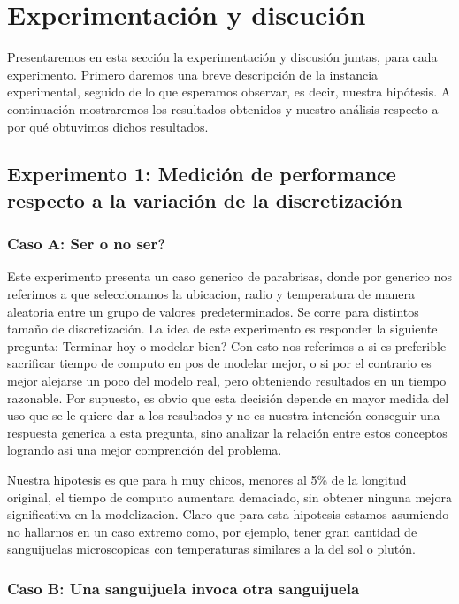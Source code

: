 \section{Experimentaci\'on y discuci\'on}

Presentaremos en esta sección la experimentación y discusión juntas, para cada experimento. Primero 
daremos una breve descripción de la instancia 
experimental, seguido de lo que esperamos observar, es decir, nuestra hipótesis. A continuación mostraremos los 
resultados obtenidos y nuestro análisis respecto a por qué obtuvimos dichos resultados. 

\subsection{Experimento 1: Medici\'on de performance respecto a la variaci\'on de la discretizaci\'on}

\subsubsection{Caso A: \textquestiondown Ser o no ser?}

Este experimento presenta un caso generico de parabrisas, donde por generico nos referimos a que seleccionamos la ubicacion,
radio y temperatura de manera aleatoria entre un grupo de valores predeterminados.
Se corre para distintos tama\~no de discretizaci\'on.
La idea de este experimento
es responder la siguiente pregunta: \textquestiondown Terminar hoy o modelar bien? Con esto nos referimos a si es 
preferible sacrificar tiempo de computo en 
pos de modelar mejor, o si por el contrario es mejor alejarse un poco del modelo real, pero obteniendo resultados 
en un tiempo razonable. Por 
supuesto, es obvio que esta decisi\'on depende en mayor medida del uso que se le quiere dar a los resultados y no 
es nuestra intenci\'on conseguir 
una respuesta generica a esta pregunta, sino analizar la relaci\'on entre estos conceptos logrando asi una mejor 
comprenci\'on del problema. 

Nuestra hipotesis es que para h muy chicos, menores al 5\% de la longitud original, el tiempo de computo aumentara
demaciado, sin obtener ninguna mejora significativa en la modelizacion. Claro que para esta hipotesis estamos 
asumiendo no hallarnos en un caso extremo como, por ejemplo, tener gran cantidad de sanguijuelas microscopicas
con temperaturas similares a la del sol o plut\'on.

\subsubsection{Caso B: Una sanguijuela invoca otra sanguijuela}


